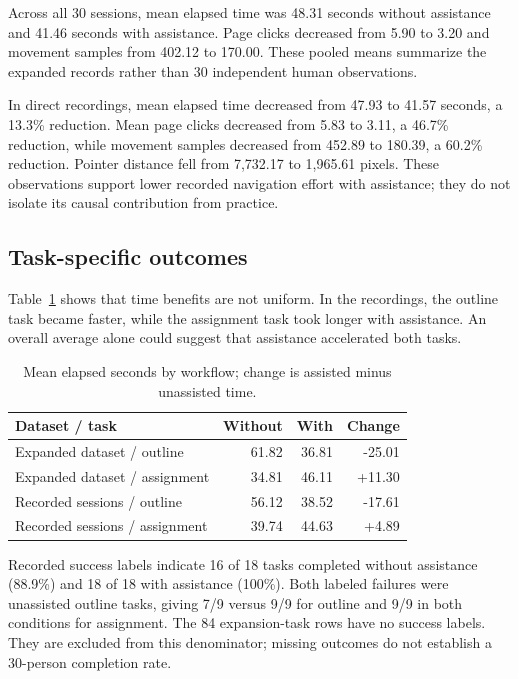 \documentclass[11pt,a4paper]{article}
\begin{document}
Across all 30 sessions, mean elapsed time was 48.31 seconds without assistance and 41.46 seconds with assistance. Page clicks decreased from 5.90 to 3.20 and movement samples from 402.12 to 170.00. These pooled means summarize the expanded records rather than 30 independent human observations.

In direct recordings, mean elapsed time decreased from 47.93 to 41.57 seconds, a 13.3\% reduction. Mean page clicks decreased from 5.83 to 3.11, a 46.7\% reduction, while movement samples decreased from 452.89 to 180.39, a 60.2\% reduction. Pointer distance fell from 7,732.17 to 1,965.61 pixels. These observations support lower recorded navigation effort with assistance; they do not isolate its causal contribution from practice.

\subsection{Task-specific outcomes}
Table~\ref{tab:tasks} shows that time benefits are not uniform. In the recordings, the outline task became faster, while the assignment task took longer with assistance. An overall average alone could suggest that assistance accelerated both tasks.
\begin{table}[htbp]\centering\small
\caption{Mean elapsed seconds by workflow; change is assisted minus unassisted time.}\label{tab:tasks}
\begin{tabular}{lrrr}\toprule
Dataset / task & Without & With & Change\\\midrule
Expanded dataset / outline & 61.82 & 36.81 & -25.01 \\
Expanded dataset / assignment & 34.81 & 46.11 & +11.30 \\
Recorded sessions / outline & 56.12 & 38.52 & -17.61 \\
Recorded sessions / assignment & 39.74 & 44.63 & +4.89 \\

\bottomrule\end{tabular}\end{table}

Recorded success labels indicate 16 of 18 tasks completed without assistance (88.9\%) and 18 of 18 with assistance (100\%). Both labeled failures were unassisted outline tasks, giving 7/9 versus 9/9 for outline and 9/9 in both conditions for assignment. The 84 expansion-task rows have no success labels. They are excluded from this denominator; missing outcomes do not establish a 30-person completion rate.
\end{document}
